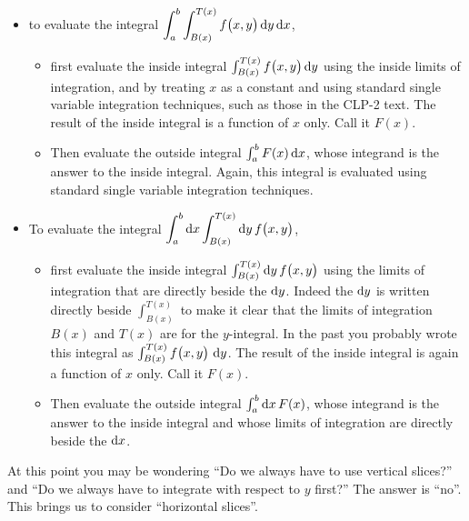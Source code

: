 \begin{itemize}
\item 
to evaluate the integral 
$\displaystyle\int_a^b \int_{B(x)}^{T(x)} f\big(x,y\big)\,\mathrm{d}y\,\mathrm{d}x$,
\begin{itemize}
  \item
  first evaluate the inside integral 
  $\int_{B(x)}^{T(x)} f\big(x,y\big)\,\mathrm{d}y$ using the inside
  limits of integration, and by treating $x$ as a constant and using 
  standard single variable integration techniques, such as those in the
  CLP-2 text. The result of the 
  inside integral is a function of $x$ only.  Call it $F(x)$.
  \item
   Then evaluate the outside integral $\int_a^b F(x)\,\mathrm{d}x$,
   whose integrand is the answer to the inside integral. Again, this
   integral is evaluated using standard single variable integration 
   techniques.
\end{itemize}

\item
To evaluate the integral 
$\displaystyle\int_a^b \mathrm{d}x \int_{B(x)}^{T(x)} \mathrm{d}y\, f\big(x,y\big)$,
\begin{itemize}
  \item
  first evaluate the inside integral 
  $\int_{B(x)}^{T(x)} \mathrm{d}y\, f\big(x,y\big)$ using the limits of 
  integration that are directly beside the $\mathrm{d}y$. Indeed the $\mathrm{d}y$
  is written directly beside $\int_{B(x)}^{T(x)}$ to make it clear that
  the limits of integration $B(x)$ and $T(x)$ are for the $y$-integral.
  In the past you probably wrote this integral as 
  $\int_{B(x)}^{T(x)} f\big(x,y\big)\ \mathrm{d}y$. The result of 
  the inside integral is again a function of $x$ only.  Call it $F(x)$.
  \item
   Then evaluate the outside integral $\int_a^b \mathrm{d}x\,F(x)$,
   whose integrand is the answer to the inside integral and whose limits
   of integration are directly beside the $\mathrm{d}x$.
\end{itemize}
\end{itemize}

At this point you may be wondering ``Do we always have to use vertical 
slices?'' and ``Do we always have to integrate with respect to $y$ first?''
The answer is ``no''. This brings us to consider ``horizontal slices''.


